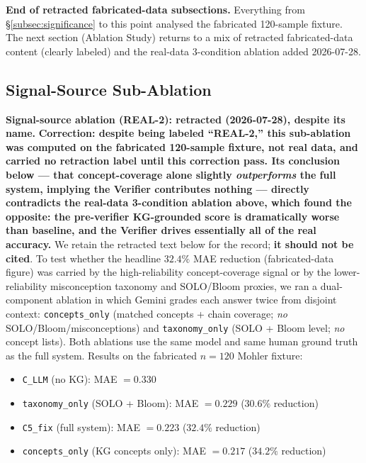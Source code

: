\documentclass[conference]{IEEEtran}
\begin{document}
\textbf{End of retracted fabricated-data subsections.} Everything from
\S\ref{subsec:significance} to this point analysed the fabricated
120-sample fixture. The next section (Ablation Study) returns to a mix
of retracted fabricated-data content (clearly labeled) and the real-data
3-condition ablation added 2026-07-28.

\subsection{Signal-Source Sub-Ablation}

\textbf{Signal-source ablation (REAL-2): retracted (2026-07-28), despite
its name.} \textbf{Correction: despite being labeled ``REAL-2,'' this
sub-ablation was computed on the fabricated 120-sample fixture, not real
data, and carried no retraction label until this correction pass. Its
conclusion below --- that concept-coverage alone slightly
\emph{outperforms} the full system, implying the Verifier contributes
nothing --- directly contradicts the real-data 3-condition ablation
above, which found the opposite: the pre-verifier KG-grounded score is
dramatically worse than baseline, and the Verifier drives essentially
all of the real accuracy.} We retain the retracted text below for the
record; \textbf{it should not be cited}. To test whether the headline
$32.4\%$ MAE reduction (fabricated-data figure) was carried by the
high-reliability concept-coverage signal or by the lower-reliability
misconception taxonomy and SOLO/Bloom proxies, we ran a dual-component
ablation in which Gemini grades each
answer twice from disjoint context: \texttt{concepts\_only} (matched
concepts + chain coverage; \emph{no} SOLO/Bloom/misconceptions) and
\texttt{taxonomy\_only} (SOLO + Bloom level; \emph{no} concept lists).
Both ablations use the same model and same human ground truth as the full
system. Results on the fabricated $n = 120$ Mohler fixture:

\begin{itemize}
\item \texttt{C\_LLM} (no KG):                 MAE $= 0.330$
\item \texttt{taxonomy\_only} (SOLO + Bloom):  MAE $= 0.229$  ($30.6\%$ reduction)
\item \texttt{C5\_fix} (full system):          MAE $= 0.223$  ($32.4\%$ reduction)
\item \texttt{concepts\_only} (KG concepts only): MAE $= 0.217$  ($\boldsymbol{34.2\%}$ reduction)
\end{itemize}
\end{document}
